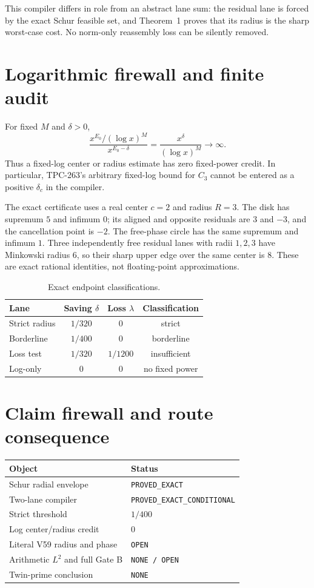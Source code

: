 \documentclass[11pt]{article}
\theoremstyle{definition}
\begin{document}
This compiler differs in role from an abstract lane sum: the residual lane is
forced by the exact Schur feasible set, and Theorem~1 proves that its radius is
the sharp worst-case cost.  No norm-only reassembly loss can be silently
removed.

\section{Logarithmic firewall and finite audit}

For fixed $M$ and $\delta>0$,
\[
 \frac{x^{E_0}/(\log x)^M}{x^{E_0-\delta}}
 =\frac{x^\delta}{(\log x)^M}\longrightarrow\infty.
\]
Thus a fixed-log center or radius estimate has zero fixed-power credit.  In
particular, TPC-263's arbitrary fixed-log bound for $C_3$ cannot be entered as
a positive $\delta_c$ in the compiler.

The exact certificate uses a real center $c=2$ and radius $R=3$.  The disk has
supremum $5$ and infimum $0$; its aligned and opposite residuals are $3$ and
$-3$, and the cancellation point is $-2$.  The free-phase circle has the same
supremum and infimum $1$.  Three independently free residual lanes with radii
$1,2,3$ have Minkowski radius $6$, so their sharp upper edge over the same
center is $8$.  These are exact rational identities, not floating-point
approximations.

\begin{table}[ht]
\centering
\begin{tabular}{lccc}
\toprule
Lane & Saving $\delta$ & Loss $\lambda$ & Classification\\
\midrule
Strict radius & $1/320$ & $0$ & strict\\
Borderline & $1/400$ & $0$ & borderline\\
Loss test & $1/320$ & $1/1200$ & insufficient\\
Log-only & $0$ & $0$ & no fixed power\\
\bottomrule
\end{tabular}
\caption{Exact endpoint classifications.}
\end{table}

\section{Claim firewall and route consequence}

\begin{center}
\begin{tabular}{ll}
\toprule
Object & Status\\
\midrule
Schur radial envelope & \texttt{PROVED\_EXACT}\\
Two-lane compiler & \texttt{PROVED\_EXACT\_CONDITIONAL}\\
Strict threshold & $1/400$\\
Log center/radius credit & $0$\\
Literal V59 radius and phase & \texttt{OPEN}\\
Arithmetic $L^2$ and full Gate B & \texttt{NONE / OPEN}\\
Twin-prime conclusion & \texttt{NONE}\\
\bottomrule
\end{tabular}
\end{center}
\end{document}
